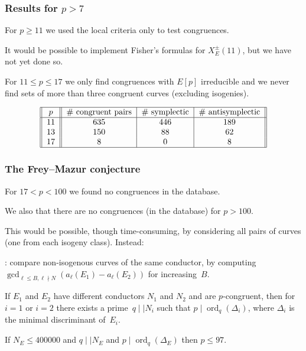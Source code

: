 \documentclass[handout]{beamer}
\DeclareMathOperator{\ord}{ord}
\newcommand{\high}[1]{\emph{\color{blue}{#1}}}
\begin{document}
\begin{frame}\frametitle{Results for $p>7$}
For $p\ge11$ we used the local criteria only to test congruences.

It would be possible to implement Fisher's formulas for
$X_E^{\pm}(11)$, but we have not yet done so.

For $11\le p\le 17$ we only find congruences with $E[p]$ irreducible
and we never find sets of more than three congruent curves (excluding
isogenies).


  \[
  \begin{tabular}{||c||c|c|c||}
    \hline
    $p$ & \# congruent pairs & \# symplectic & \# antisymplectic\\
    \hline
    11 & 635 & 446 & 189 \\
    13 & 150 & 88 & 62 \\
    17 & 8 & 0 & 8 \\
    \hline
  \end{tabular}
  \]
\end{frame}

\begin{frame}\frametitle{The Frey--Mazur conjecture}
  For $17 < p < 100$ we found no congruences in the database.

  We also \high{proved} that there are no congruences (in the
  database) for $p>100$.

  This would be possible, though time-consuming, by considering all
  pairs of curves (one from each isogeny class). Instead:

  \medskip\pause

  \high{First}: compare non-isogenous curves of the same conductor, by
  computing $\gcd_{\ell\le B, \ell\nmid
    N}(a_{\ell}(E_1)-a_{\ell}(E_2))$ for increasing~$B$.

  \medskip\pause

  \begin{lemma}
    If $E_1$ and $E_2$ have different conductors $N_1$ and $N_2$
  and are $p$-congruent, then for $i=1$ or $i=2$ there exists a
  prime~$q\mid\mid N_i$ such that $p\mid\ord_q(\Delta_i)$, where
  $\Delta_i$ is the minimal discriminant of~$E_i$.
  \end{lemma}
  \begin{lemma}
  If $N_E\le 400000$ and $q\mid\mid N_E$ and $p\mid\ord_q(\Delta_E)$
  then $p\le97$.
  \end{lemma}
\end{frame}
\end{document}
